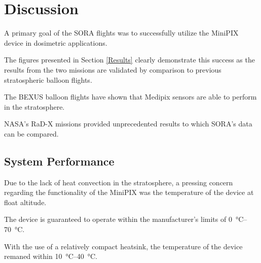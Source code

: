 
\section{Discussion}

\label{Discussion}





A primary goal of the SORA flights was to successfully utilize the MiniPIX device in dosimetric applications.

The figures presented in Section \ref{Results} clearly demonstrate this success as the results from the two missions are validated by comparison to previous stratospheric balloon flights.

The BEXUS \cite{bexus} balloon flights have shown that Medipix sensors are able to perform in the stratosphere.

NASA's RaD-X missions \cite{rad-x} provided unprecedented results to which SORA's data can be compared.



\subsection{System Performance}



Due to the lack of heat convection in the stratosphere, a pressing concern regarding the functionality of the MiniPIX was the temperature of the device at float altitude. 

The device is guaranteed to operate within the manufacturer's limits of \SIrange{0}{70}{\celsius}.

With the use of a relatively compact heatsink, the temperature of the device remaned within \SIrange{10}{40}{\celsius}.

